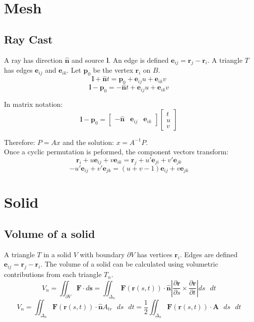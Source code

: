 

\section{Mesh}
\subsection{Ray Cast}
A ray has direction $\mathbf{\hat n}$ and source $\mathbf l$. An edge is defined $\mathbf e_{ij} = \mathbf r_j - \mathbf r_i$. A triangle $T$ has edges $\mathbf e_{ij}$ and $\mathbf e_{ik}$. Let $\mathbf p_0$ be the vertex $\mathbf r_i$ on $B$. 
$$ \mathbf l + \mathbf{\hat n}t = \mathbf p_0 + \mathbf e_{ij}u + \mathbf e_{ik}v $$
$$ \mathbf l - \mathbf p_0 =  -\mathbf{\hat n}t + \mathbf e_{ij}u + \mathbf e_{ik}v $$

In matrix notation:
$$ \mathbf l - \mathbf p_0 = 
 \begin{bmatrix}
  -\mathbf{\hat n} & \mathbf e_{ij} & \mathbf e_{ik}
 \end{bmatrix}
 \begin{bmatrix}
  t \\
  u \\
  v
 \end{bmatrix}
$$

Therefore: $P = Ax$ and the solution: $x = A^{-1} P$. \\

Once a cyclic permutation is peformed, the component vectors transform:
$$
\mathbf r_i + u \mathbf e_{ij} + v \mathbf e_{ik} = \mathbf r_j + u' \mathbf e_{ji} + v' \mathbf e_{jk}
$$
$$
-u' \mathbf e_{ij} + v' \mathbf e_{jk} = \left(u+v-1\right)\mathbf e_{ij} + v \mathbf e_{jk}
$$
\newpage




\section{Solid}
\subsection{Volume of a solid}
A triangle $T$ in a solid $V$ with boundary $\partial V$ has vertices $\mathbf r_i$. Edges are defined $\mathbf e_{ij} = \mathbf r_j - \mathbf r_i$. The volume of a solid can be calculated using volumetric contributions from each triangle $T_n$.
$$
V_n = \iint_{\partial V}\mathbf F\cdot d\mathbf{s} = 
\iint_{\Delta_n}\mathbf F(\mathbf r(s, t))\cdot\mathbf{\hat n}\left|\frac{\partial\mathbf r}{\partial s}\times\frac{\partial\mathbf r}{\partial t} \right| ds\mbox{ }dt
$$
$$
V_n = \iint_{\Delta_n}\mathbf F(\mathbf r(s, t))\cdot\mathbf{\hat n}A_{tr}\mbox{ }ds\mbox{ }dt =
\frac{1}{2}\iint_{\Delta_n}\mathbf F(\mathbf r(s, t))\cdot\mathbf A \mbox{ }ds\mbox{ }dt
$$

